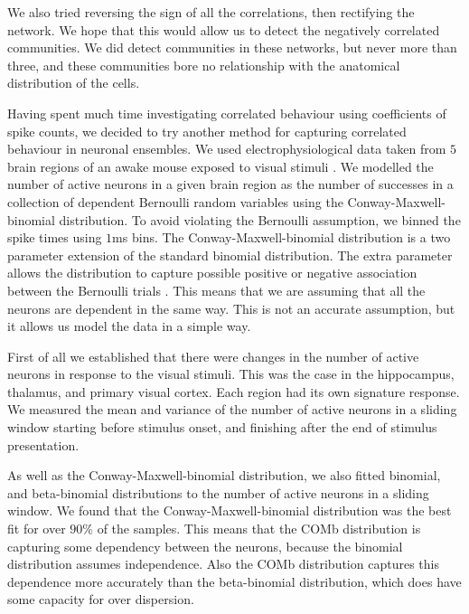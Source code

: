 We also tried reversing the sign of all the correlations, then rectifying the network. We hope that this would allow us to detect the negatively correlated communities. We did detect communities in these networks, but never more than three, and these communities bore no relationship with the anatomical distribution of the cells.


Having spent much time investigating correlated behaviour using coefficients of spike counts, we decided to try another method for capturing correlated behaviour in neuronal ensembles. We used electrophysiological data taken from $5$ brain regions of an awake mouse exposed to visual stimuli \parencite{steinmetz2019}. We modelled the number of active neurons in a given brain region as the number of successes in a collection of dependent Bernoulli random variables using the Conway-Maxwell-binomial distribution. To avoid violating the Bernoulli assumption, we binned the spike times using $1$ms bins. The Conway-Maxwell-binomial distribution is a two parameter extension of the standard binomial distribution. The extra parameter allows the distribution to capture possible positive or negative association between the Bernoulli trials \parencite{kadane_2016}. This means that we are assuming that all the neurons are dependent in the same way. This is not an accurate assumption, but it allows us model the data in a simple way.

First of all we established that there were changes in the number of active neurons in response to the visual stimuli. This was the case in the hippocampus, thalamus, and primary visual cortex. Each region had its own signature response. We measured the mean and variance of the number of active neurons in a sliding window starting before stimulus onset, and finishing after the end of stimulus presentation.

As well as the Conway-Maxwell-binomial distribution, we also fitted binomial, and beta-binomial distributions to the number of active neurons in a sliding window. We found that the Conway-Maxwell-binomial distribution was the best fit for over $90\%$ of the samples. This means that the COMb distribution is capturing some dependency between the neurons, because the binomial distribution assumes independence. Also the COMb distribution captures this dependence more accurately than the beta-binomial distribution, which does have some capacity for over dispersion.

